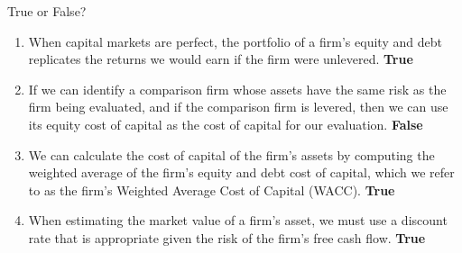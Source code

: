 \begin{examplebox}{True or False?}
\begin{enumerate}
    \item When capital markets are perfect, the portfolio of a firm’s equity and debt replicates the returns we would earn if the firm were unlevered. \textbf{True}
    \item If we can identify a comparison firm whose assets have the same risk as the firm being evaluated, and if the comparison firm is levered, then we can use its equity cost of capital as the cost of capital for our evaluation. \textbf{False}
    
    \item We can calculate the cost of capital of the firm’s assets by computing the weighted average of the firm’s equity and debt cost of capital, which we refer to as the firm’s Weighted Average Cost of Capital (WACC). \textbf{True}
    
    \item When estimating the market value of a firm’s asset, we must use a discount rate that is appropriate given the risk of the firm’s free cash flow. \textbf{True}
\end{enumerate}
\end{examplebox}
